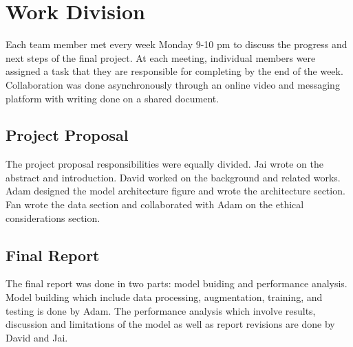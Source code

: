 \documentclass[../main.tex]{subfiles}
\begin{document}
\section{Work Division} 
Each team member met every week Monday 9-10 pm to 
discuss the progress and next steps of the final project. At each meeting, 
individual members were assigned a task that they are responsible for completing 
by the end of the week. Collaboration was done asynchronously through an online 
video and messaging platform with writing done on a shared document.

\subsection{Project Proposal} 
The project proposal responsibilities were equally divided. Jai wrote on 
the abstract and introduction. David worked on the background and related works.
Adam designed the model architecture figure and wrote the architecture section. 
Fan wrote the data section and collaborated with Adam on the ethical 
considerations section.


\subsection{Final Report} 

The final report was done in two parts: model buiding and performance analysis. 
Model building which include data processing, augmentation, training, and testing
is done by Adam. 
The performance analysis which involve results, discussion and limitations of 
the model as well as report revisions are done by David and Jai.
\end{document}

